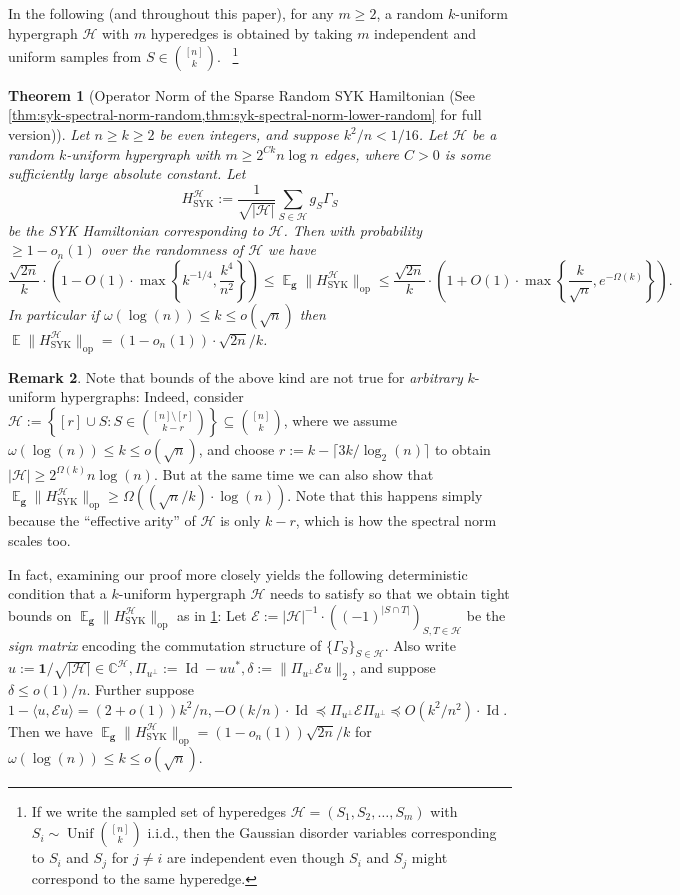 \documentclass
[11pt,letterpaper]
{article}
\newtheorem{theorem}{Theorem}[section]
\theoremstyle{definition}
\newtheorem{remark}[theorem]{Remark}
\newcommand{\cE}{{\mathcal E}}
\newcommand{\1}{\mathbf{1}}
\newcommand{\C}{\mathbb C}
\newcommand{\cH}{\mathcal H}
\newcommand{\Id}{\operatorname{Id}}
\newcommand{\seq}{\subseteq}
\DeclareMathOperator*{\E}{\mathbb{E}}
\renewcommand{\geq}{\geqslant}
\renewcommand{\leq}{\leqslant}
\renewcommand{\preceq}{\preccurlyeq}
\newcommand{\Unif}{\operatorname{Unif}}
\begin{document}
In the following (and throughout this paper), for any $m\geq 2$, a random $k$-uniform hypergraph $\cH$ with $m$ hyperedges is obtained by taking $m$ independent and uniform samples from $S\in\binom{[n]}{k}$. ~\footnote{If we write the sampled set of hyperedges $\cH = (S_1,S_2,\dots,S_m)$ with $S_i \sim\Unif\binom{[n]}{k}$ i.i.d., then the Gaussian disorder variables corresponding to $S_i$ and $S_j$ for $j\neq i$ are independent even though $S_i$ and $S_j$ might correspond to the same hyperedge.}

\begin{theorem}[Operator Norm of the Sparse Random SYK Hamiltonian (See \cref{thm:syk-spectral-norm-random,thm:syk-spectral-norm-lower-random} for full version)]\label{thm:main-thm-random}
    Let $n\geq k\geq 2$ be even integers, and suppose $k^2/n < 1/16$.  Let $\cH$ be a random $k$-uniform hypergraph with $m\geq 2^{Ck}n\log n$ edges, where $C > 0$ is some sufficiently large absolute constant. Let 
    \[H^\cH_{\operatorname{SYK}}:= \frac{1}{\sqrt{|\cH|}}\sum_{S\in\cH}g_S\Gamma_S\]
    be the SYK Hamiltonian corresponding to $\cH$. Then with probability $\geq 1 - o_n(1)$ over the randomness of $\cH$ we have 
    \[\frac{\sqrt{2n}}{k}\cdot
\left(
1-O(1)\cdot\max\left\{
k^{-1/4},
\frac{k^4}{n^2}
\right\}
\right)\leq\E_{\bm g}\|H^\cH_{\operatorname{SYK}}\|_{\operatorname{op}}\leq\frac{\sqrt{2n}}{k}\cdot\left(1 + O(1)\cdot\max\left\{\frac{k}{\sqrt{n}}, e^{-\Omega(k)}\right\}\right).\]
    In particular if $\omega(\log(n))\leq k\leq o(\sqrt{n})$ then $\E\|H^\cH_{\operatorname{SYK}}\|_{\operatorname{op}} = (1 - o_n(1))\cdot\sqrt{2n}/k$.
\end{theorem}
\begin{remark}
    Note that bounds of the above kind are not true for \emph{arbitrary} $k$-uniform hypergraphs: Indeed, consider $\cH:= \left\{[r]\cup S:S\in\binom{[n]\setminus[r]}{k - r}\right\}\seq\binom{[n]}{k}$, where we assume $\omega(\log(n))\leq k\leq o(\sqrt{n})$, and choose $r:= k - \lceil 3k/\log_2(n)\rceil$ to obtain $|\cH|\geq 2^{\Omega(k)}n\log(n)$. But at the same time we can also show that $\E_{\bm g}\|H^\cH_{\operatorname{SYK}}\|_{\operatorname{op}}\geq\Omega((\sqrt{n}/k)\cdot\log(n))$. Note that this happens simply because the ``effective arity'' of $\cH$ is only $k - r$, which is how the spectral norm scales too. 

    In fact, examining our proof more closely yields the following deterministic condition that a $k$-uniform hypergraph $\cH$ needs to satisfy so that we obtain tight bounds on $\E_{\bm g}\|H^\cH_{\operatorname{SYK}}\|_{\operatorname{op}}$ as in \cref{thm:main-thm-random}: Let $\cE:= |\cH|^{-1}\cdot((-1)^{|S\cap T|})_{S, T\in\cH}$ be the \emph{sign matrix} encoding the commutation structure of $\{\Gamma_S\}_{S\in\cH}$. Also write $u:= \1/\sqrt{|\cH|}\in\C^\cH, \Pi_{u^\perp}:= \Id - uu^*, \delta:= \|\Pi_{u^\perp}\cE u\|_2$, and suppose $\delta\leq o(1)/n$. Further suppose $1-\langle u,\cE u\rangle = (2+o(1))k^2/n,-O(k/n)\cdot\Id\preceq\Pi_{u^\perp}\cE\Pi_{u^\perp}\preceq O(k^2/n^2)\cdot\Id$. Then we have $\E_{\bm g}\|H^\cH_{\operatorname{SYK}}\|_{\operatorname{op}} = (1 - o_n(1))\sqrt{2n}/k$ for $\omega(\log(n))\leq k\leq o(\sqrt{n})$.
\end{remark}
\end{document}
